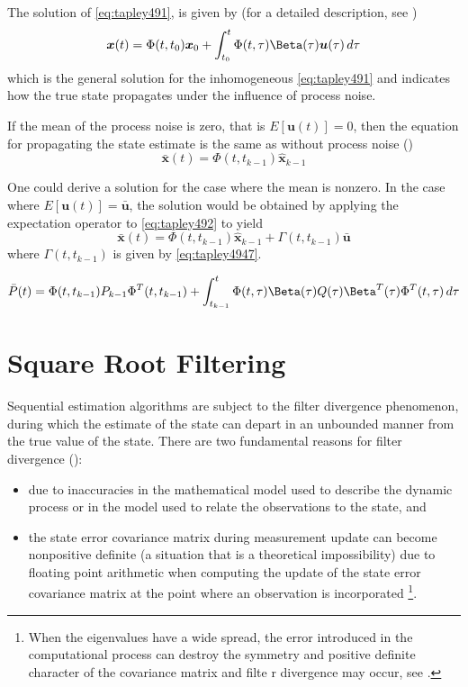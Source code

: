 The solution of \ref{eq:tapley491}, is given by (for a detailed description, see \cite{tapley})
\begin{equation}
  \label{eq:tapley4914}
  \bm{x} (t) = \Phi(t, t_0) \bm{x}_0 + 
    \int_{t_0}^{t} \Phi(t, \tau ) \Beta (\tau ) \bm{u} (\tau ) \, d\tau 
\end{equation}
which is the general solution for the inhomogeneous \ref{eq:tapley491} and
indicates how the true state propagates under the influence of process noise.

If the mean of the process noise is zero, that is \(E \left[ \bm{u} (t) \right] = 0 \), 
then the equation for propagating the state estimate is the same as without process noise
(\cite{tapley})
\begin{equation}
  \label{eq:tapley4919}
  \bar{\bm{x}} (t) = \Phi (t , t_{k-1} ) \hat{\bm{x}}_{k-1}
\end{equation}

One could derive a solution for the case where the mean is nonzero. In the case 
where \(E \left[ \bm{u} (t) \right] = \bar{\bm{u}} \), 
the solution would be obtained by applying the expectation operator to \ref{eq:tapley492} 
to yield
\begin{equation}
  \label{eq:tapley4920}
  \bar{\bm{x}} (t) = \Phi (t , t_{k-1} ) \hat{\bm{x}}_{k-1} + \Gamma (t , t_{k-1} ) \bar{\bm{u}}
\end{equation}
where \(\Gamma (t , t_{k-1} )\) is given by \ref{eq:tapley4947}.

\begin{equation}
  \label{eq:tapley4944}
  \bar{P}(t) = \Phi (t , t_{k-1} ) P_{k-1} \Phi ^T (t , t_{k-1} )
    +  \int_{t_{k-1}}^{t} \Phi(t, \tau ) \Beta (\tau ) Q (\tau ) \Beta ^T (\tau ) \Phi ^T (t, \tau ) \, d\tau
\end{equation}

\section{Square Root Filtering}
\label{sec:square-root-filtering}
Sequential estimation algorithms are subject to the filter divergence phenomenon, during 
which the estimate of the state can depart in an unbounded manner from the true value 
of the state. There are two fundamental reasons for filter divergence (\cite{tapley}):
\begin{itemize}
  \item due to inaccuracies in the mathematical model used to describe the dynamic 
  process or in the model used to relate the observations to the state, and
  \item the state error covariance matrix during measurement update can become nonpositive 
  definite (a situation that is a theoretical impossibility) due to floating point 
  arithmetic when computing the update of the state error covariance matrix at the 
  point where an observation is incorporated \footnote{When the eigenvalues have a wide spread, the error
introduced in the computational process can destroy the symmetry and positive
definite character of the covariance matrix and filte r divergence may occur, see \cite{tapley}.}.
\end{itemize}

